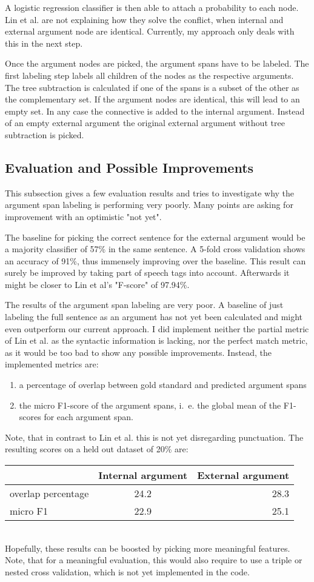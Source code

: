 \documentclass[10pt,a4paper]{article}
\begin{document}
A logistic regression classifier is then able to attach a probability to each node. Lin et al. are not explaining how they solve the conflict, when internal and external argument node are identical. Currently, my approach only deals with this in the next step.

Once the argument nodes are picked, the argument spans have to be labeled. The first labeling step labels all children of the nodes as the respective arguments. The tree subtraction is calculated if one of the spans is a subset of the other as the complementary set. If the argument nodes are identical, this will lead to an empty set. In any case the connective is added to the internal argument. Instead of an empty external argument the original external argument without tree subtraction is picked.


\subsection{Evaluation and Possible Improvements}
This subsection gives a few evaluation results and tries to investigate why the argument span labeling is performing very poorly. Many points are asking for improvement with an optimistic "not yet".

The baseline for picking the correct sentence for the external argument would be a majority classifier of 57\% in the same sentence.
A 5-fold cross validation shows an accuracy of 91\%, thus immensely improving over the baseline. This result can surely be improved by taking part of speech tags into account. Afterwards it might be closer to Lin et al's "F-score" of 97.94\%.

The results of the argument span labeling are very poor. A baseline of just labeling the full sentence as an argument has not yet been calculated and might even outperform our current approach. I did implement neither the partial metric of Lin et al. as the syntactic information is lacking, nor the perfect match metric, as it would be too bad to show any possible improvements. Instead, the implemented metrics are:
\begin{enumerate}
\item a percentage of overlap between gold standard and predicted argument spans
\item the micro F1-score of the argument spans, i.~e. the global mean of the F1-scores for each argument span.
\end{enumerate}
Note, that in contrast to Lin et al. this is not yet disregarding punctuation.
The resulting scores on a held out dataset of 20\% are:\\
\begin{tabular}{l || c | r}
   & Internal argument  & External argument \\
   \hline
   \hline
 overlap percentage  & 24.2  & 28.3 \\
   \hline
 micro F1  & 22.9  & 25.1 \\
\end{tabular}\\
Hopefully, these results can be boosted by picking more meaningful features. Note, that for a meaningful evaluation, this would also require to use a triple or nested cross validation, which is not yet implemented in the code.
\end{document}
